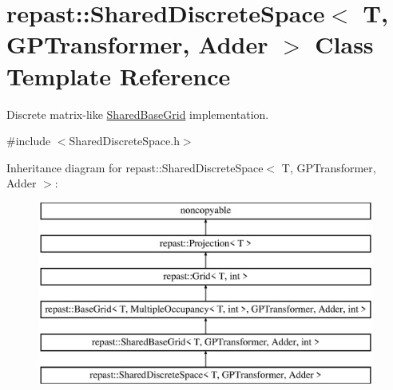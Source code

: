 \hypertarget{classrepast_1_1_shared_discrete_space}{\section{repast\-:\-:Shared\-Discrete\-Space$<$ T, G\-P\-Transformer, Adder $>$ Class Template Reference}
\label{classrepast_1_1_shared_discrete_space}
}


Discrete matrix-\/like \hyperlink{classrepast_1_1_shared_base_grid}{Shared\-Base\-Grid} implementation.  




{\ttfamily \#include $<$Shared\-Discrete\-Space.\-h$>$}

Inheritance diagram for repast\-:\-:Shared\-Discrete\-Space$<$ T, G\-P\-Transformer, Adder $>$\-:\begin{figure}[H]
\begin{center}
\leavevmode
\includegraphics[height=6.000000cm]{classrepast_1_1_shared_discrete_space}
\end{center}
\end{figure}
